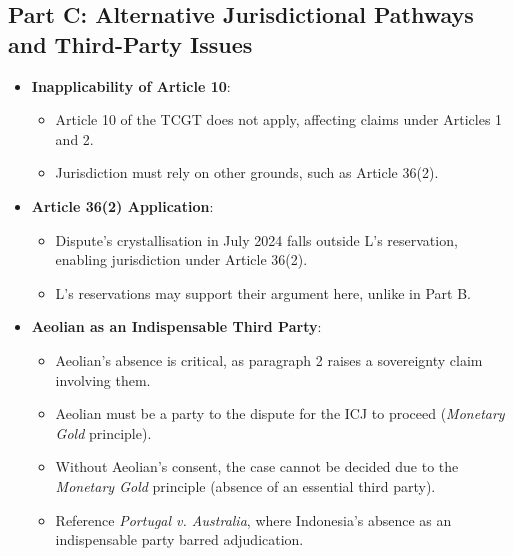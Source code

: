\subsection{Part C: Alternative Jurisdictional Pathways and Third-Party Issues}
\begin{itemize}
    \item \textbf{Inapplicability of Article 10}:
    \begin{itemize}
        \item Article 10 of the TCGT does not apply, affecting claims under Articles 1 and 2.
        \item Jurisdiction must rely on other grounds, such as Article 36(2).
    \end{itemize}
    \item \textbf{Article 36(2) Application}:
    \begin{itemize}
        \item Dispute's crystallisation in July 2024 falls outside L's reservation, enabling jurisdiction under Article 36(2).
        \item L's reservations may support their argument here, unlike in Part B.
    \end{itemize}
    \item \textbf{Aeolian as an Indispensable Third Party}:
    \begin{itemize}
        \item Aeolian's absence is critical, as paragraph 2 raises a sovereignty claim involving them.
        \item Aeolian must be a party to the dispute for the ICJ to proceed (\textit{Monetary Gold} principle).
        \item Without Aeolian's consent, the case cannot be decided due to the \textit{Monetary Gold} principle (absence of an essential third party).
        \item Reference \textit{Portugal v. Australia}, where Indonesia's absence as an indispensable party barred adjudication.
    \end{itemize}
\end{itemize}


